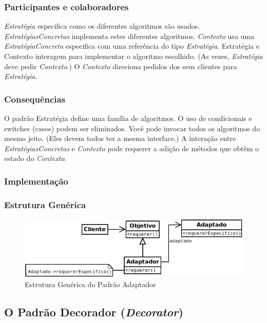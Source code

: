 \subsubsection{Participantes e colaboradores}
\emph{Estratégia} especifica como os diferentes algoritmos são usados. \emph{EstratégiasConcretas} implementa estes diferentes algoritmos. \emph{Contexto} usa uma \emph{EstratégiaConcreta} especifica com uma referência do tipo \emph{Estratégia}. Estratégia e Contexto interagem para implementar o algoritmo escolhido. (As vezes, \emph{Estratégia} deve pedir \emph{Contexto}.) O \emph{Contexto} direciona pedidos dos seus clientes para \emph{Estratégia}.

\subsubsection{Consequências}
O padrão Estratégia define uma família de algoritmos. O uso de condicionais e switches (casos) podem ser eliminados. Você pode invocar todos os algoritmos do mesmo jeito. (Eles devem todos ter a mesma interface.) A interação entre \emph{EstratégiasConcretas} e \emph{Contexto} pode requerer a adição de métodos que obtêm o estado do \emph{Contexto}.

\subsubsection{Implementação}
\subsubsection{Estrutura Genérica}

\begin{figure}[h]
\begin{center}
\includegraphics[scale=0.6]{adaptador.png}
\caption{Estrutura Genérica do Padrão Adaptador}\label{fig:adaptador}
\end{center}
\end{figure}

\subsection{O Padrão Decorador (\textit{Decorator})}
